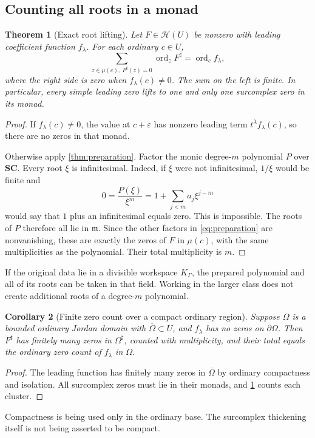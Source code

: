 \documentclass[11pt,letterpaper]{article}
\newtheorem{theorem}{Theorem}[section]
\newtheorem{corollary}[theorem]{Corollary}
\theoremstyle{definition}
\theoremstyle{remark}
\newcommand{\SC}{\mathbf{SC}}
\newcommand{\HH}{\mathcal H}
\newcommand{\mm}{\mathfrak m}
\newcommand{\ord}{\operatorname{ord}}
\newcommand{\sh}{^{\sharp}}
\numberwithin{equation}{section}
\begin{document}
\subsection{Counting all roots in a monad}
\begin{theorem}[Exact root lifting]\label{thm:rootlifting}
Let $F\in\HH(U)$ be nonzero with leading coefficient function $f_\lambda$. For each ordinary $c\in U$,
\begin{equation}\label{eq:rootcount}
 \sum_{z\in\mu(c),\ F\sh(z)=0}\ord_z F\sh
 =\ord_c f_\lambda,
\end{equation}
where the right side is zero when $f_\lambda(c)\ne0$. The sum on the left is finite. In particular, every simple leading zero lifts to one and only one surcomplex zero in its monad.
\end{theorem}
\begin{proof}
If $f_\lambda(c)\ne0$, the value at $c+\varepsilon$ has nonzero leading term $t^\lambda f_\lambda(c)$, so there are no zeros in that monad.

Otherwise apply \cref{thm:preparation}. Factor the monic degree-$m$ polynomial $P$ over $\SC$. Every root $\xi$ is infinitesimal. Indeed, if $\xi$ were not infinitesimal, $1/\xi$ would be finite and
\[
 0=\frac{P(\xi)}{\xi^m}
   =1+\sum_{j<m}a_j\xi^{j-m}
\]
would say that $1$ plus an infinitesimal equals zero. This is impossible. The roots of $P$ therefore all lie in $\mm$. Since the other factors in \eqref{eq:preparation} are nonvanishing, these are exactly the zeros of $F$ in $\mu(c)$, with the same multiplicities as the polynomial. Their total multiplicity is $m$.
\end{proof}
If the original data lie in a divisible workspace $K_\Gamma$, the prepared polynomial and all of its roots can be taken in that field. Working in the larger class does not create additional roots of a degree-$m$ polynomial.

\begin{corollary}[Finite zero count over a compact ordinary region]\label{cor:finitezeros}
Suppose $\Omega$ is a bounded ordinary Jordan domain with $\overline\Omega\subset U$, and $f_\lambda$ has no zeros on $\partial\Omega$. Then $F\sh$ has finitely many zeros in $\Omega\sh$, counted with multiplicity, and their total equals the ordinary zero count of $f_\lambda$ in $\Omega$.
\end{corollary}
\begin{proof}
The leading function has finitely many zeros in $\overline\Omega$ by ordinary compactness and isolation. All surcomplex zeros must lie in their monads, and \cref{thm:rootlifting} counts each cluster.
\end{proof}
Compactness is being used only in the ordinary base. The surcomplex thickening itself is not being asserted to be compact.
\end{document}

